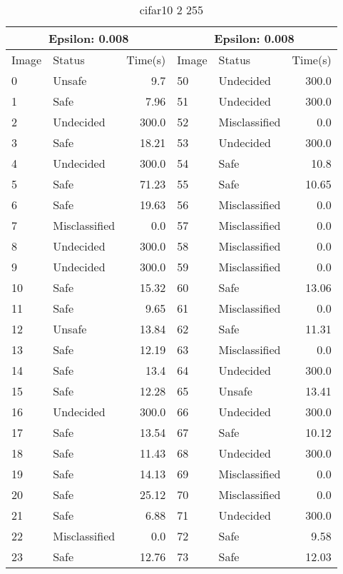 \begin{table}[!ht]
  \centering
  \caption{cifar10 2 255}
  \footnotesize
  \begin{tabular}{|llr|llr|}
    \toprule
    \multicolumn{3}{|c|}{Epsilon: 0.008} & \multicolumn{3}{|c|}{Epsilon: 0.008} \\
    \midrule
    Image & Status & Time(s) &Image & Status & Time(s)\\ 
    \midrule
    0 & Unsafe & 9.7 &    50 & Undecided & 300.0\\ 
    1 & Safe & 7.96 &    51 & Undecided & 300.0\\ 
    2 & Undecided & 300.0 &    52 & Misclassified & 0.0\\ 
    3 & Safe & 18.21 &    53 & Undecided & 300.0\\ 
    4 & Undecided & 300.0 &    54 & Safe & 10.8\\ 
    5 & Safe & 71.23 &    55 & Safe & 10.65\\ 
    6 & Safe & 19.63 &    56 & Misclassified & 0.0\\ 
    7 & Misclassified & 0.0 &    57 & Misclassified & 0.0\\ 
    8 & Undecided & 300.0 &    58 & Misclassified & 0.0\\ 
    9 & Undecided & 300.0 &    59 & Misclassified & 0.0\\ 
    10 & Safe & 15.32 &    60 & Safe & 13.06\\ 
    11 & Safe & 9.65 &    61 & Misclassified & 0.0\\ 
    12 & Unsafe & 13.84 &    62 & Safe & 11.31\\ 
    13 & Safe & 12.19 &    63 & Misclassified & 0.0\\ 
    14 & Safe & 13.4 &    64 & Undecided & 300.0\\ 
    15 & Safe & 12.28 &    65 & Unsafe & 13.41\\ 
    16 & Undecided & 300.0 &    66 & Undecided & 300.0\\ 
    17 & Safe & 13.54 &    67 & Safe & 10.12\\ 
    18 & Safe & 11.43 &    68 & Undecided & 300.0\\ 
    19 & Safe & 14.13 &    69 & Misclassified & 0.0\\ 
    20 & Safe & 25.12 &    70 & Misclassified & 0.0\\ 
    21 & Safe & 6.88 &    71 & Undecided & 300.0\\ 
    22 & Misclassified & 0.0 &    72 & Safe & 9.58\\ 
    23 & Safe & 12.76 &    73 & Safe & 12.03\\ 

\end{tabular}
\end{table}
